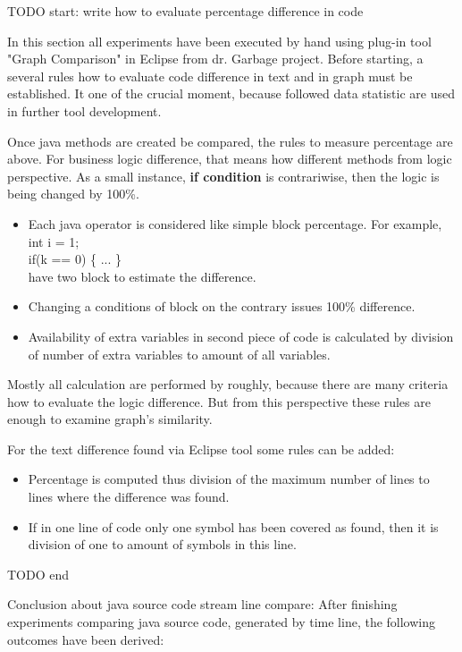 \documentclass{report}
\begin{document}
TODO start: write how to evaluate percentage difference in code

In this section all experiments have been executed by hand using plug-in tool "Graph Comparison" in Eclipse from dr. Garbage project. Before starting, a several rules how to evaluate code difference in text and in graph must be established. It one of the crucial moment, because followed data statistic are used in further tool development.

Once java methods are created be compared, the rules to measure percentage are above.
For business logic difference, that means how different methods from logic perspective. As a small instance, \textbf{if condition} is contrariwise, then the logic is being changed by 100\%.
\begin{itemize}
	\item Each java operator is considered like simple block percentage. For example, 
	int i = 1; 	\\
	if(k == 0) \{ ... \} \\
	have two block to estimate the difference.
	\item Changing a conditions of block on the contrary issues 100\% difference.
	\item Availability of extra variables in second piece of code is calculated by division of 
	number of extra variables to amount of all variables.
\end{itemize}
Mostly all calculation are performed by roughly, because there are many criteria how to evaluate the logic difference. But from this perspective these rules are enough to examine graph's similarity.

For the text difference found via Eclipse tool some rules can be added:
\begin{itemize}
	\item Percentage is computed thus division of the maximum number of lines to lines where the difference was found.
	\item If in one line of code only one symbol has been covered as found, then it is division of one to amount of symbols in this line. 
\end{itemize}

TODO end

Conclusion about java source code stream line compare:
After finishing experiments comparing java source code, generated by time line, the following outcomes have been derived:
\end{document}
